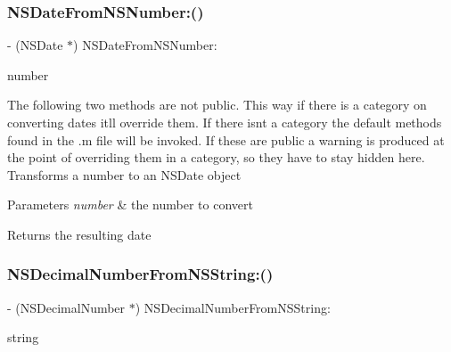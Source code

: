 \subsubsection{\texorpdfstring{N\+S\+Date\+From\+N\+S\+Number\+:()}{NSDateFromNSNumber:()}}
{\footnotesize\ttfamily -\/ (N\+S\+Date $\ast$) N\+S\+Date\+From\+N\+S\+Number\+: \begin{DoxyParamCaption}\item[{(N\+S\+Number $\ast$)}]{number }\end{DoxyParamCaption}}

The following two methods are not public. This way if there is a category on converting dates it\textquotesingle{}ll override them. If there isn\textquotesingle{}t a category the default methods found in the .m file will be invoked. If these are public a warning is produced at the point of overriding them in a category, so they have to stay hidden here. Transforms a number to an N\+S\+Date object 
\begin{DoxyParams}{Parameters}
{\em number} & the number to convert \\
\hline
\end{DoxyParams}
\begin{DoxyReturn}{Returns}
the resulting date 
\end{DoxyReturn}
\mbox{\label{interface_o_p_t_l_y_j_s_o_n_value_transformer_a9c0418c26d16c434ef5a83513b160323}} 
\subsubsection{\texorpdfstring{N\+S\+Decimal\+Number\+From\+N\+S\+String\+:()}{NSDecimalNumberFromNSString:()}}
{\footnotesize\ttfamily -\/ (N\+S\+Decimal\+Number $\ast$) N\+S\+Decimal\+Number\+From\+N\+S\+String\+: \begin{DoxyParamCaption}\item[{(N\+S\+String $\ast$)}]{string }\end{DoxyParamCaption}}

